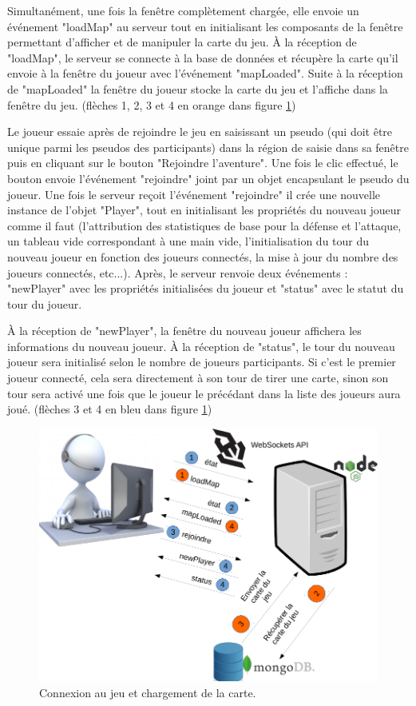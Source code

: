 \documentclass[12pt]{report}
\begin{document}
			Simultanément, une fois la fenêtre complètement chargée, elle envoie un événement "loadMap" au serveur tout en initialisant les composants de la fenêtre permettant d'afficher et de manipuler la carte du jeu. À la réception de "loadMap", le serveur se connecte à la base de données et récupère la carte qu'il envoie à la fenêtre du joueur avec l'événement "mapLoaded". Suite à la réception de "mapLoaded" la fenêtre du joueur stocke la carte du jeu et l'affiche dans la fenêtre du jeu. (flèches 1, 2, 3 et 4 en orange dans figure \ref{fig:useCase1})

			Le joueur essaie après de rejoindre le jeu en saisissant un pseudo (qui doit être unique parmi les pseudos des participants) dans la région de saisie dans sa fenêtre puis en cliquant sur le bouton "Rejoindre l'aventure". Une fois le clic effectué, le bouton envoie l'événement "rejoindre" joint par un objet encapsulant le pseudo du joueur. Une fois le serveur reçoit l'événement "rejoindre" il crée une nouvelle instance de l'objet "Player", tout en initialisant les propriétés du nouveau joueur comme il faut (l'attribution des statistiques de base pour la défense et l'attaque, un tableau vide correspondant à une main vide, l'initialisation du tour du nouveau joueur en fonction des joueurs connectés, la mise à jour du nombre des joueurs connectés, etc...). Après, le serveur renvoie deux événements : "newPlayer" avec les propriétés initialisées du joueur et "status" avec le statut du tour du joueur.

			À la réception de "newPlayer", la fenêtre du nouveau joueur affichera les informations du nouveau joueur. À la réception de "status", le tour du nouveau joueur sera initialisé selon le nombre de joueurs participants. Si c'est le premier joueur connecté, cela sera directement à son tour de tirer une carte, sinon son tour sera activé une fois que le joueur le précédant dans la liste des joueurs aura joué. (flèches 3 et 4 en bleu dans figure \ref{fig:useCase1})

			\begin{figure}[h!]
		  	\centering
		    \includegraphics[scale=0.5]{images/useCase1.png}
		    \caption{Connexion au jeu et chargement de la carte.}
				\label{fig:useCase1}
		  \end{figure}
\end{document}
